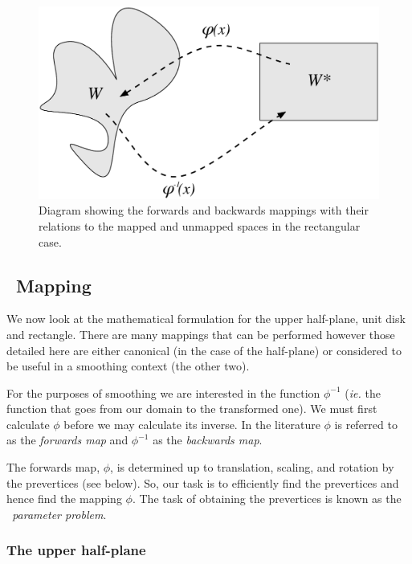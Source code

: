 \begin{figure} [tbp]
\centering
\includegraphics[scale=0.5]{sc/figs/mappingdia.pdf}
\caption{Diagram showing the forwards and backwards mappings with their relations to the mapped and unmapped spaces in the rectangular case.}
\label{mappingdia}
\end{figure}

\subsection{\sch\ Mapping}
\label{schparprob}
We now look at the mathematical formulation for the upper half-plane, unit disk and rectangle. There are many mappings that can be performed however those detailed here are either canonical (in the case of the half-plane) or considered to be useful in a smoothing context (the other two).

For the purposes of smoothing we are interested in the function $\phi^{-1}$ (\emph{ie.} the function that goes from our domain to the transformed one). We must first calculate $\phi$ before we may calculate its inverse. In the literature $\phi$ is referred to as the \emph{forwards map} and $\phi^{-1}$ as the \emph{backwards map}.

The forwards map, $\phi$, is determined up to translation, scaling, and rotation by the prevertices (see below). So, our task is to efficiently find the prevertices and hence find the mapping $\phi$. The task of obtaining the prevertices is known as the \emph{\sch\ parameter problem}.

\subsubsection{The upper half-plane}
\label{sc-parprob}

